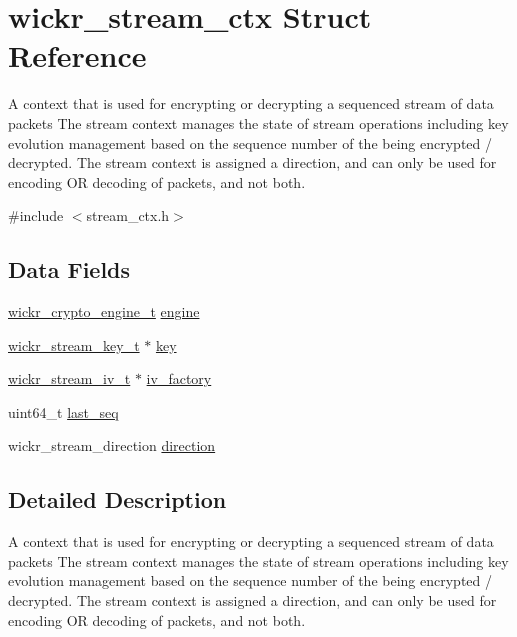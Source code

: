 \hypertarget{structwickr__stream__ctx}{}\section{wickr\+\_\+stream\+\_\+ctx Struct Reference}
\label{structwickr__stream__ctx}


A context that is used for encrypting or decrypting a sequenced stream of data packets The stream context manages the state of stream operations including key evolution management based on the sequence number of the being encrypted / decrypted. The stream context is assigned a direction, and can only be used for encoding OR decoding of packets, and not both.  




{\ttfamily \#include $<$stream\+\_\+ctx.\+h$>$}

\subsection*{Data Fields}
\begin{DoxyCompactItemize}
\item 
\hyperlink{structwickr__crypto__engine}{wickr\+\_\+crypto\+\_\+engine\+\_\+t} \hyperlink{structwickr__stream__ctx_a14ef322bbeec579ded7f35c5aeb0d3fa}{engine}
\item 
\hyperlink{structwickr__stream__key}{wickr\+\_\+stream\+\_\+key\+\_\+t} $\ast$ \hyperlink{structwickr__stream__ctx_a3598b3c0415d13fafab6633f8c00a3c8}{key}
\item 
\hyperlink{structwickr__stream__iv}{wickr\+\_\+stream\+\_\+iv\+\_\+t} $\ast$ \hyperlink{structwickr__stream__ctx_a67c5066e87dbdc026358563daa51f174}{iv\+\_\+factory}
\item 
uint64\+\_\+t \hyperlink{structwickr__stream__ctx_abf2c6ab54e1663e6a47e310fd68b3b3f}{last\+\_\+seq}
\item 
wickr\+\_\+stream\+\_\+direction \hyperlink{structwickr__stream__ctx_a34c622c3ca61348321261ee7a9c3ff91}{direction}
\end{DoxyCompactItemize}


\subsection{Detailed Description}
A context that is used for encrypting or decrypting a sequenced stream of data packets The stream context manages the state of stream operations including key evolution management based on the sequence number of the being encrypted / decrypted. The stream context is assigned a direction, and can only be used for encoding OR decoding of packets, and not both. 


